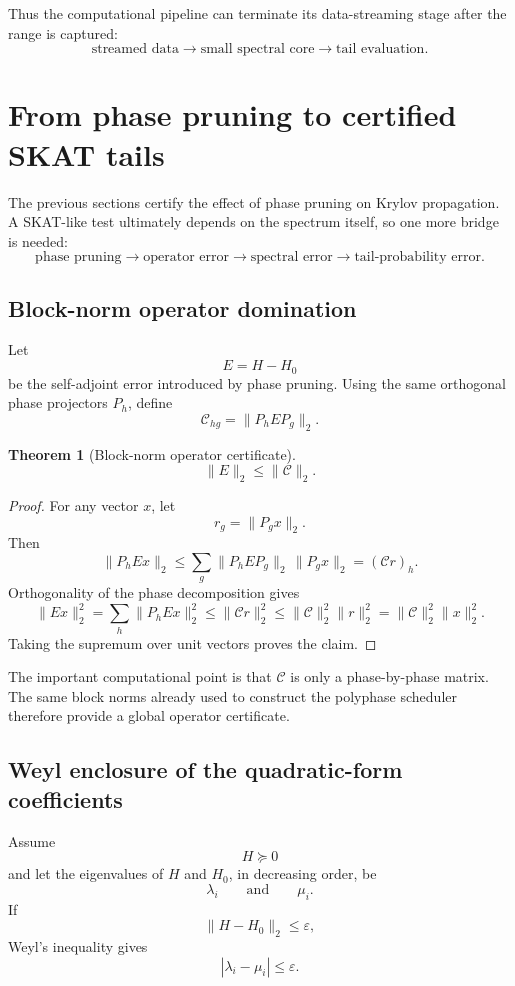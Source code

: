 \documentclass[11pt]{article}
\newtheorem{theorem}{Theorem}[section]
\theoremstyle{definition}
\theoremstyle{remark}
\begin{document}
Thus the computational pipeline can terminate its data-streaming stage after
the range is captured:
\[
\boxed{
\text{streamed data}
\to
\text{small spectral core}
\to
\text{tail evaluation}.
}
\]

\section{From phase pruning to certified SKAT tails}

The previous sections certify the effect of phase pruning on Krylov
propagation.  A SKAT-like test ultimately depends on the spectrum itself, so
one more bridge is needed:
\[
\text{phase pruning}
\longrightarrow
\text{operator error}
\longrightarrow
\text{spectral error}
\longrightarrow
\text{tail-probability error}.
\]

\subsection{Block-norm operator domination}

Let
\[
E=H-H_0
\]
be the self-adjoint error introduced by phase pruning.  Using the same
orthogonal phase projectors \(P_h\), define
\[
\mathcal C_{hg}
=
\|P_hEP_g\|_2.
\]

\begin{theorem}[Block-norm operator certificate]
\[
\boxed{
\|E\|_2
\le
\|\mathcal C\|_2.
}
\]
\end{theorem}

\begin{proof}
For any vector \(x\), let
\[
r_g=\|P_gx\|_2.
\]
Then
\[
\|P_hEx\|_2
\le
\sum_g
\|P_hEP_g\|_2\,\|P_gx\|_2
=
(\mathcal C r)_h.
\]
Orthogonality of the phase decomposition gives
\[
\|Ex\|_2^2
=
\sum_h\|P_hEx\|_2^2
\le
\|\mathcal C r\|_2^2
\le
\|\mathcal C\|_2^2\|r\|_2^2
=
\|\mathcal C\|_2^2\|x\|_2^2.
\]
Taking the supremum over unit vectors proves the claim.
\end{proof}

The important computational point is that \(\mathcal C\) is only a
phase-by-phase matrix.  The same block norms already used to construct the
polyphase scheduler therefore provide a global operator certificate.

\subsection{Weyl enclosure of the quadratic-form coefficients}

Assume
\[
H\succeq0
\]
and let the eigenvalues of \(H\) and \(H_0\), in decreasing order, be
\[
\lambda_i
\qquad\text{and}\qquad
\mu_i.
\]
If
\[
\|H-H_0\|_2\le\varepsilon,
\]
Weyl's inequality gives
\[
|\lambda_i-\mu_i|\le\varepsilon.
\]
\end{document}
